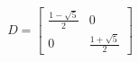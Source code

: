 \documentclass[preview]{standalone}
\begin{document}
\begin{center}
$$D = \begin{bmatrix}  \frac{1 - \sqrt{5}}{2} &  0 \\ 0 & \frac{1 + \sqrt{5}}{2} \end{bmatrix}$$
\end{center}
\end{document}
